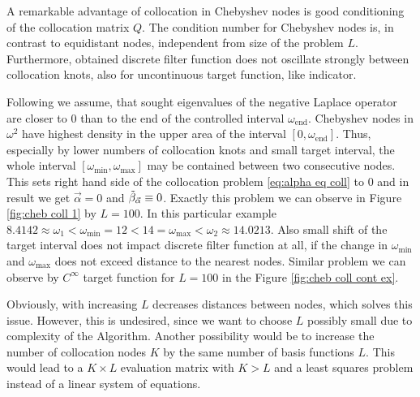 \documentclass[a4paper,11pt,bibliography=totoc,listof=totoc,headinclude=true,cleardoublepage=empty,oneside]{scrbook}
\newcommand{\dffv}{\Tilde{\beta}_{\Vec{\alpha}}}
\newcommand{\e}{\mathrm{end}}
\begin{document}
A remarkable advantage of collocation in Chebyshev nodes is good conditioning of the collocation matrix $Q$. The condition number for Chebyshev nodes is, in contrast to equidistant nodes, independent from size of the problem $L$. Furthermore, obtained discrete filter function does not oscillate strongly between collocation knots, also for uncontinuous target function, like indicator.  

Following \cite{nannen} we assume, that sought eigenvalues of the negative Laplace operator are closer to 0 than to the end of the controlled interval $\omega_\e$. Chebyshev nodes in $\omega^2$ have highest density in the upper area of the interval $[0, \omega_\e]$. Thus, especially by lower numbers of collocation knots and small target interval, the whole interval $\left[\omega_{\min}, \omega_{\max} \right]$ may be contained between two consecutive nodes. This sets right hand side of the collocation problem \eqref{eq:alpha eq coll} to 0 and in result we get $\Vec{\alpha}=0$ and $\dffv \equiv 0$. Exactly this problem we can observe in Figure \ref{fig:cheb coll 1} by $L=100$. In this particular example $ 8.4142\approx\omega_1 < \omega_{\min} = 12  <  14 = \omega_{\max}  < \omega_2 \approx 14.0213 $. Also small shift of the target interval does not impact discrete filter function at all, if the change in $\omega_{\min}$ and $\omega_{\max}$ does not exceed distance to the nearest nodes. Similar problem we can observe by $C^\infty$ target function for $L=100$ in the Figure \ref{fig:cheb coll cont ex}. 

Obviously, with increasing $L$ decreases distances between nodes, which solves this issue. However, this is undesired, since we want to choose $L$ possibly small due to complexity of the Algorithm. Another possibility would be to increase the number of collocation nodes $K$ by the same number of basis functions $L$. This would lead to a $K\times L$ evaluation matrix with $K>L$ and a least squares problem instead of a linear system of equations.
\end{document}
